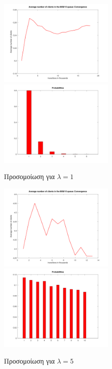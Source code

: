 \documentclass {article}
\begin{document}
\begin{figure}
    \centering
    \includegraphics[width=0.5\textwidth]{lambda-1-average-clients.png}\hfill
    \includegraphics[width=0.5\textwidth]{lambda-1-probs.png}\hfill
    \caption{Προσομοίωση για $λ=1$}
    \label{fig:lambda-1}
\end{figure}

\begin{figure}
    \centering
    \includegraphics[width=0.5\textwidth]{lambda-5-average-clients.png}\hfill
    \includegraphics[width=0.5\textwidth]{lambda-5-probs.png}\hfill
    \caption{Προσομοίωση για $λ=5$}
    \label{fig:lambda-5}
\end{figure}
\end{document}
